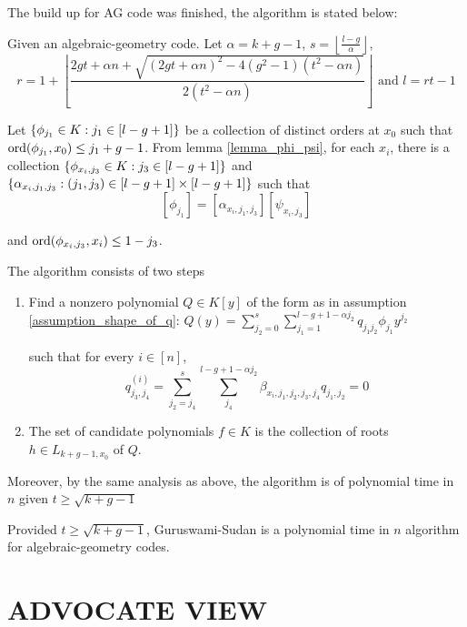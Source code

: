 \documentclass{article}
\begin{document}
The build up for AG code was finished, the algorithm is stated below:

\begin{definition}
    Given an algebraic-geometry code. Let $\alpha = k + g - 1$, $s = \left\lfloor \frac{l - g}{\alpha}\right\rfloor$,
    $$
        r = 1 + \left\lfloor \frac{2gt + \alpha n + \sqrt{(2gt + \alpha n)^2 - 4(g^2 - 1)(t^2 - \alpha n)}}{2 (t^2 - \alpha n)} \right\rfloor \text{ and } l = rt - 1
    $$

    Let $\{\phi_{j_1} \in K: j_1 \in [l-g+1]\}$ be a collection of distinct orders at $x_0$ such that $\operatorname{ord}(\phi_{j_1}, x_0) \leq j_1 + g - 1$. From lemma \ref{lemma_phi_psi}, for each $x_i$, there is a collection $\{\phi_{x_i, j_3} \in K: j_3 \in [l-g+1]\}$ and $\{\alpha_{x_i, j_1, j_3}: (j_1, j_3) \in [l-g+1] \times [l-g+1]\}$ such that
    $$
        [\phi_{j_1}] = [\alpha_{x_i, j_1, j_3}] [\psi_{x_i, j_3}]
    $$

    and $\operatorname{ord}(\phi_{x_i, j_3}, x_i) \leq 1 - j_3$. 

    The algorithm consists of two steps
    \begin{enumerate}
        \item Find a nonzero polynomial $Q \in K[y]$ of the form as in assumption \ref{assumption_shape_of_q}: 
        $
            Q(y) = \sum_{j_2 = 0}^s \sum_{j_1=1}^{l - g + 1 - \alpha j_2} q_{j_1 j_2} \phi_{j_1} y^{j_2}
        $

        such that for every $i \in [n]$, 
        $$
            q^{(i)}_{j_3, j_4} = \sum_{j_2=j_4}^s \sum_{j_4}^{l-g+1-\alpha j_2} \beta_{x_i, j_1, j_2, j_3, j_4} q_{j_1, j_2} = 0
        $$

        \item The set of candidate polynomials $f \in K$ is the collection of roots $h \in L_{k+g-1, x_0}$ of $Q$. 
    \end{enumerate}
\end{definition}

Moreover, by the same analysis as above, the algorithm is of polynomial time in $n$ given $t \geq \sqrt{k + g - 1}$

\begin{theorem}
    Provided $t \geq \sqrt{k + g - 1}$, Guruswami-Sudan is a polynomial time in $n$ algorithm for algebraic-geometry codes.
\end{theorem}

\pagebreak
\section{ADVOCATE VIEW}
\end{document}
